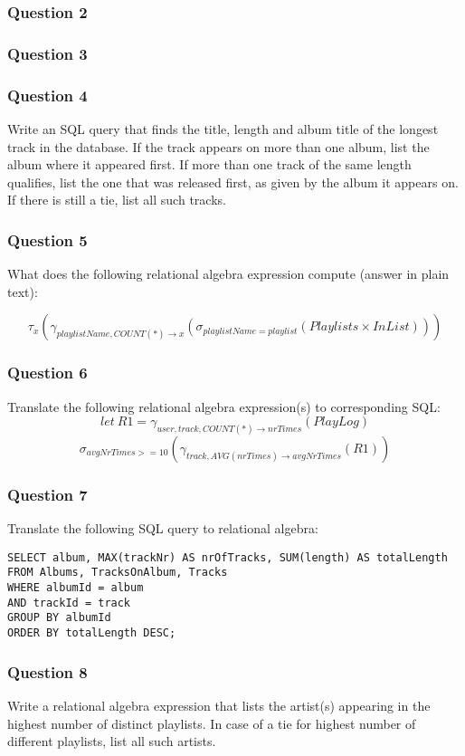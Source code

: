\documentclass{beamer}
\begin{document}
\begin{frame}
  \frametitle{Question 2}

\end{frame}

\begin{frame}
  \frametitle{Question 3}
\end{frame}

\begin{frame}
  \frametitle{Question 4}
  Write an SQL query that finds the title, length and album title of the longest
  track in the database. If the track appears on more than one album, list the
  album where it appeared first. If more than one track of the same length
  qualifies, list the one that was released first, as given by the album it
  appears on. If there is still a tie, list all such tracks.
\end{frame}

\begin{frame}
  \frametitle{Question 5}
  What does the following relational algebra expression compute (answer in
  plain text):
  
  $$
    \tau_x(
      \gamma_{playlistName,COUNT(*)\rightarrow x}(
        \sigma_{playlistName=playlist}(Playlists \times InList)
      )
    )
  $$
\end{frame}

\begin{frame}
  \frametitle{Question 6}
  Translate the following relational algebra expression(s) to corresponding SQL:
  $$ let\ R1 = \gamma_{user,track,COUNT(*)\rightarrow nrTimes}(PlayLog) $$
  $$ \sigma_{avgNrTimes>=10}(\gamma_{track,AVG(nrTimes)\rightarrow avgNrTimes}(R1)) $$
\end{frame}

\begin{frame}[fragile]
  \frametitle{Question 7}
  Translate the following SQL query to relational algebra:
\footnotesize
\begin{verbatim}
SELECT album, MAX(trackNr) AS nrOfTracks, SUM(length) AS totalLength
FROM Albums, TracksOnAlbum, Tracks
WHERE albumId = album
AND trackId = track
GROUP BY albumId
ORDER BY totalLength DESC;
\end{verbatim}
\end{frame}

\begin{frame}
  \frametitle{Question 8}
  Write a relational algebra expression that lists the artist(s) appearing in the
  highest number of distinct playlists. In case of a tie for highest number of
  different playlists, list all such artists.
\end{frame}
\end{document}
